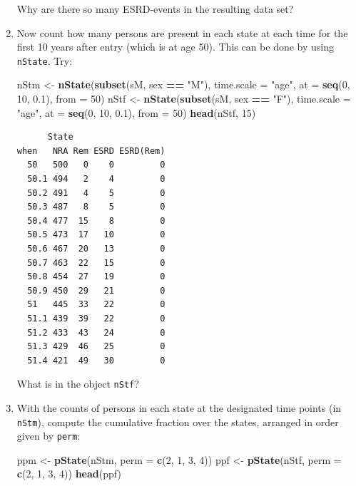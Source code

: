 \documentclass[
]{book}
\newenvironment{Shaded}{\begin{snugshade}}{\end{snugshade}}
\newcommand{\AttributeTok}[1]{\textcolor[rgb]{0.13,0.29,0.53}{#1}}
\newcommand{\DecValTok}[1]{\textcolor[rgb]{0.00,0.00,0.81}{#1}}
\newcommand{\FloatTok}[1]{\textcolor[rgb]{0.00,0.00,0.81}{#1}}
\newcommand{\FunctionTok}[1]{\textcolor[rgb]{0.13,0.29,0.53}{\textbf{#1}}}
\newcommand{\NormalTok}[1]{#1}
\newcommand{\OtherTok}[1]{\textcolor[rgb]{0.56,0.35,0.01}{#1}}
\newcommand{\SpecialCharTok}[1]{\textcolor[rgb]{0.81,0.36,0.00}{\textbf{#1}}}
\newcommand{\StringTok}[1]{\textcolor[rgb]{0.31,0.60,0.02}{#1}}
\begin{document}
\begin{enumerate}
  Why are there so many ESRD-events in the resulting data set?
\item
  Now count how many persons are present in each state
  at each time for the first 10 years after entry (which is at age 50). This
  can be done by using \texttt{nState}. Try:

\begin{Shaded}
\begin{Highlighting}[]
\NormalTok{nStm }\OtherTok{\textless{}{-}} \FunctionTok{nState}\NormalTok{(}\FunctionTok{subset}\NormalTok{(sM, sex }\SpecialCharTok{==} \StringTok{"M"}\NormalTok{), }\AttributeTok{time.scale =} \StringTok{"age"}\NormalTok{, }
               \AttributeTok{at =} \FunctionTok{seq}\NormalTok{(}\DecValTok{0}\NormalTok{, }\DecValTok{10}\NormalTok{, }\FloatTok{0.1}\NormalTok{), }
             \AttributeTok{from =} \DecValTok{50}\NormalTok{)}
\NormalTok{nStf }\OtherTok{\textless{}{-}} \FunctionTok{nState}\NormalTok{(}\FunctionTok{subset}\NormalTok{(sM, sex }\SpecialCharTok{==} \StringTok{"F"}\NormalTok{), }\AttributeTok{time.scale =} \StringTok{"age"}\NormalTok{, }
               \AttributeTok{at =} \FunctionTok{seq}\NormalTok{(}\DecValTok{0}\NormalTok{, }\DecValTok{10}\NormalTok{, }\FloatTok{0.1}\NormalTok{), }
             \AttributeTok{from =} \DecValTok{50}\NormalTok{)}
\FunctionTok{head}\NormalTok{(nStf, }\DecValTok{15}\NormalTok{)}
\end{Highlighting}
\end{Shaded}

\begin{verbatim}
      State
when   NRA Rem ESRD ESRD(Rem)
  50   500   0    0         0
  50.1 494   2    4         0
  50.2 491   4    5         0
  50.3 487   8    5         0
  50.4 477  15    8         0
  50.5 473  17   10         0
  50.6 467  20   13         0
  50.7 463  22   15         0
  50.8 454  27   19         0
  50.9 450  29   21         0
  51   445  33   22         0
  51.1 439  39   22         0
  51.2 433  43   24         0
  51.3 429  46   25         0
  51.4 421  49   30         0
\end{verbatim}

  What is in the object \texttt{nStf}?
\item
  With the counts of persons in each state at the
  designated time points (in \texttt{nStm}), compute the cumulative
  fraction over the states, arranged in order given by \texttt{perm}:

\begin{Shaded}
\begin{Highlighting}[]
\NormalTok{ppm }\OtherTok{\textless{}{-}} \FunctionTok{pState}\NormalTok{(nStm, }\AttributeTok{perm =} \FunctionTok{c}\NormalTok{(}\DecValTok{2}\NormalTok{, }\DecValTok{1}\NormalTok{, }\DecValTok{3}\NormalTok{, }\DecValTok{4}\NormalTok{))}
\NormalTok{ppf }\OtherTok{\textless{}{-}} \FunctionTok{pState}\NormalTok{(nStf, }\AttributeTok{perm =} \FunctionTok{c}\NormalTok{(}\DecValTok{2}\NormalTok{, }\DecValTok{1}\NormalTok{, }\DecValTok{3}\NormalTok{, }\DecValTok{4}\NormalTok{))}
\FunctionTok{head}\NormalTok{(ppf)}
\end{Highlighting}
\end{Shaded}


\end{enumerate}
\end{document}
